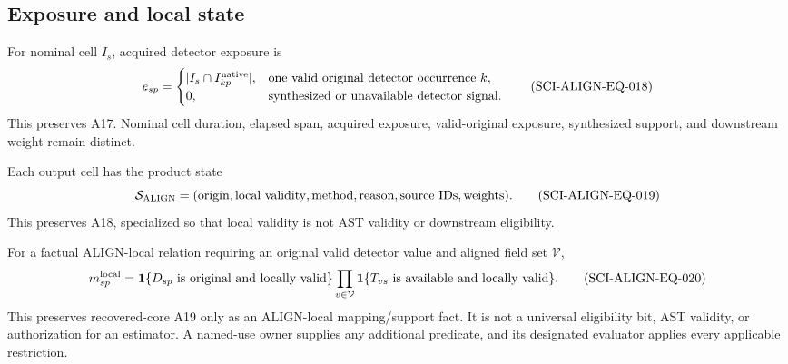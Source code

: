 \subsection{Exposure and local state}

For nominal cell \(I_s\), acquired detector exposure is
\begin{equation}
 e_{sp}=\begin{cases}
 |I_s\cap I^{\rm native}_{kp}|,
   &\text{one valid original detector occurrence }k,\\
 0,&\text{synthesized or unavailable detector signal.}
 \end{cases}
 \tag{SCI-ALIGN-EQ-018}\label{eq:exposure}
\end{equation}
\noindent This preserves A17.  Nominal cell duration, elapsed span, acquired
exposure, valid-original exposure, synthesized support, and downstream weight
remain distinct.

Each output cell has the product state
\begin{equation}
 \mathcal S_{\rm ALIGN}=(\text{origin},\text{local validity},\text{method},\text{reason},
 \text{source IDs},\text{weights}).
 \tag{SCI-ALIGN-EQ-019}\label{eq:quality}
\end{equation}
\noindent This preserves A18, specialized so that local validity is not AST
validity or downstream eligibility.

For a factual ALIGN-local relation requiring an original valid detector value
and aligned field set \(\mathcal V\),
\begin{equation}
 m_{sp}^{\rm local}=
 \mathbf 1\{D_{sp}\text{ is original and locally valid}\}
 \prod_{v\in\mathcal V}
 \mathbf 1\{T_{vs}\text{ is available and locally valid}\}.
 \tag{SCI-ALIGN-EQ-020}\label{eq:local-support}
\end{equation}
\noindent This preserves recovered-core A19 only as an ALIGN-local
mapping/support fact.  It is not a universal eligibility bit, AST validity,
or authorization for an estimator.  A named-use owner supplies any additional
predicate, and its designated evaluator applies every applicable restriction.
